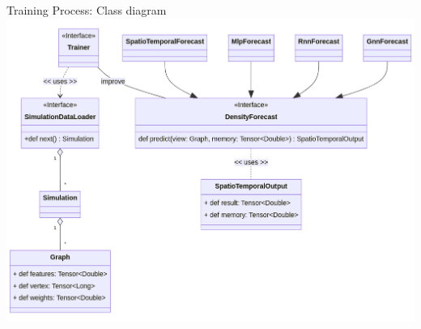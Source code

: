 \documentclass[presentation, 9pt]{beamer}\mode<presentation>{\usetheme{AMSBolognaFC}}
\begin{document}
\begin{frame}{Training Process: Class diagram}
\centering
\includegraphics[height=0.9\textheight]{img/structure-training.png}
\end{frame}
\end{document}
